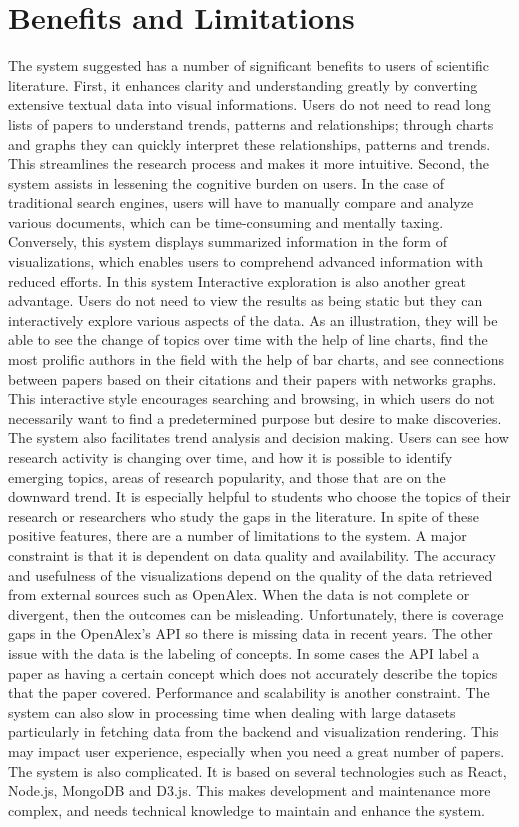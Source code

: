 \documentclass[sigconf]{acmart}
\begin{document}
\section{Benefits and Limitations}  
The system suggested has a number of significant benefits to users of scientific literature. First, it enhances clarity and understanding greatly by converting extensive textual data into visual informations. Users do not need to read long lists of papers to understand trends, patterns and relationships; through charts and graphs they can quickly interpret these relationships, patterns and trends. This streamlines the research process and makes it more intuitive. Second, the system assists in lessening the cognitive burden on users. In the case of traditional search engines, users will have to manually compare and analyze various documents, which can be time-consuming and mentally taxing. Conversely, this system displays summarized information in the form of visualizations, which enables users to comprehend advanced information with reduced efforts. In this system 
Interactive exploration is also another great advantage. Users do not need to view the results as being static but they can interactively explore various aspects of the data. As an illustration, they will be able to see the change of topics over time with the help of line charts, find the most prolific authors in the field with the help of bar charts, and see connections between papers based on their citations and their papers with networks graphs. This interactive style encourages searching and browsing, in which users do not necessarily want to find a predetermined purpose but desire to make discoveries. The system also facilitates trend analysis and decision making. Users can see how research activity is changing over time, and how it is possible to identify emerging topics, areas of research popularity, and those that are on the downward trend. It is especially helpful to students who choose the topics of their research or researchers who study the gaps in the literature. In spite of these positive features, there are a number of limitations to the system. A major constraint is that it is dependent on data quality and availability. The accuracy and usefulness of the visualizations depend on the quality of the data retrieved from external sources such as OpenAlex. When the data is not complete or divergent, then the outcomes can be misleading. Unfortunately, there is coverage gaps in the OpenAlex's API so there is missing data in recent years. The other issue with the data is the labeling of concepts. In some cases the API label a paper as having a certain concept which does not accurately describe the topics that the paper covered. Performance and scalability is another constraint. The system can also slow in processing time when dealing with large datasets particularly in fetching data from the backend and visualization rendering. This may impact user experience, especially when you need a great number of papers.  The system is also complicated. It is based on several technologies such as React, Node.js, MongoDB and D3.js. This makes development and maintenance more complex, and needs technical knowledge to maintain and enhance the system.
\end{document}
